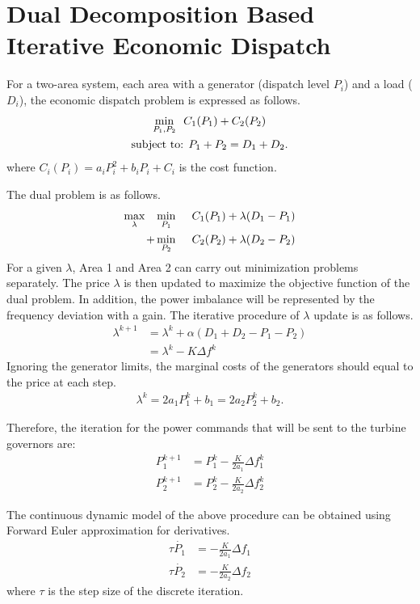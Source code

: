 \documentclass[10pt, journal, final, twocolumns]{IEEEtran}
\begin{document}
\section{Dual Decomposition Based Iterative Economic Dispatch}
For a two-area system, each area with a generator (dispatch level $P_i$)  and a load ($D_i$), the economic dispatch problem is expressed as follows.
\begin{align}
\min_{P_1, P_2} \>\>\>& C_1(P_1) + C_2(P_2) \notag\\
\text{subject to:} &\>\> P_1+P_2=D_1+D_2.
\end{align}
where $C_i(P_i) = a_iP^2_i+b_iP_i+C_i$ is the cost function.

The dual problem is as follows.
\begin{align}
\max_{\lambda}\>\>\>\>& \min_{P_1} & C_1(P_1) + \lambda(D_1-P_1) \notag\\
  + &   \min_{P_2} \>\>& C_2(P_2) + \lambda(D_2-P_2) 
\end{align}
For a given $\lambda$, Area 1 and Area 2 can carry out minimization problems separately. The price $\lambda$ is then updated to maximize the objective function of the dual problem. In addition, the power imbalance will be represented by the frequency deviation with a gain.
The iterative procedure of $\lambda$ update is as follows.
\begin{align}
\lambda^{k+1} &= \lambda^{k} + \alpha(D_1+D_2-P_1-P_2) \\
              &= \lambda^{k} - K\Delta f^k
\end{align}
Ignoring the generator limits, the marginal costs of the generators should equal to the price at each step.
\begin{align}
\lambda^k = 2a_1P^k_1 + b_1 = 2a_2P^k_2 + b_2.
\end{align}

Therefore, the iteration for the power commands that will be sent to the turbine governors are:
\begin{align}
P^{k+1}_1&=P^k_1 - \frac{K}{2a_1}\Delta f_1^k\\
P^{k+1}_2&=P^k_2 - \frac{K}{2a_2}\Delta f_2^k
\end{align}

The continuous dynamic model of the above procedure can be obtained using Forward Euler approximation for derivatives.
\begin{align}
\tau \dot{P_1} &= - \frac{K}{2a_1}\Delta f_1\\
\tau \dot{P_2} &= - \frac{K}{2a_2}\Delta f_2
\end{align}
where $\tau$ is the step size of the discrete iteration.
\end{document}
